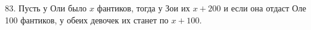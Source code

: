 83. Пусть у Оли было $x$ фантиков, тогда у Зои их $x+200$ и если она отдаст Оле 100 фантиков, у обеих девочек их станет по $x+100.$\\
